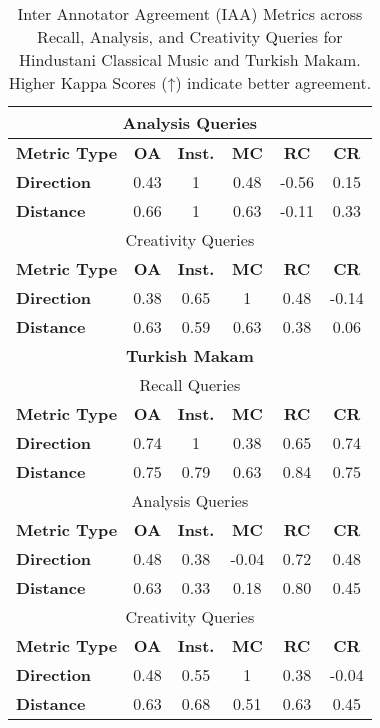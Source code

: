 \begin{table*}[!t]
\begin{minipage}{\textwidth}
{\begin{tabular}{lccccc}
\multicolumn{6}{c}{Analysis Queries} \\ \midrule
\textbf{Metric Type} & \textbf{OA} & \textbf{Inst.} & \textbf{MC} & \textbf{RC} & \textbf{CR} \\ \midrule
\textbf{Direction} & 0.43 & 1 & 0.48 & -0.56 & 0.15 \\
\textbf{Distance}  & 0.66 & 1 & 0.63 & -0.11 & 0.33 \\ \midrule

\multicolumn{6}{c}{Creativity Queries} \\ \midrule
\textbf{Metric Type} & \textbf{OA} & \textbf{Inst.} & \textbf{MC} & \textbf{RC} & \textbf{CR} \\ \midrule
\textbf{Direction} & 0.38 & 0.65 & 1 & 0.48 & -0.14 \\
\textbf{Distance}  & 0.63 & 0.59 & 0.63 & 0.38 & 0.06 \\ \midrule

\multicolumn{6}{c}{\textbf{Turkish Makam}} \\ \midrule

\multicolumn{6}{c}{Recall Queries} \\ \midrule
\textbf{Metric Type} & \textbf{OA} & \textbf{Inst.} & \textbf{MC} & \textbf{RC} & \textbf{CR} \\ \midrule
\textbf{Direction} & 0.74 & 1 & 0.38 & 0.65 & 0.74 \\
\textbf{Distance}  & 0.75 & 0.79 & 0.63 & 0.84 & 0.75 \\ \midrule

\multicolumn{6}{c}{Analysis Queries} \\ \midrule
\textbf{Metric Type} & \textbf{OA} & \textbf{Inst.} & \textbf{MC} & \textbf{RC} & \textbf{CR} \\ \midrule
\textbf{Direction} & 0.48 & 0.38 & -0.04 & 0.72 & 0.48 \\
\textbf{Distance}  & 0.63 & 0.33 & 0.18 & 0.80 & 0.45 \\ \midrule

\multicolumn{6}{c}{Creativity Queries} \\ \midrule
\textbf{Metric Type} & \textbf{OA} & \textbf{Inst.} & \textbf{MC} & \textbf{RC} & \textbf{CR} \\ \midrule
\textbf{Direction} & 0.48 & 0.55 & 1 & 0.38 & -0.04 \\
\textbf{Distance}  & 0.63 & 0.68 & 0.51 & 0.63 & 0.45 \\
\bottomrule
\end{tabular}}
\end{minipage}
\caption{Inter Annotator Agreement (IAA) Metrics across Recall, Analysis, and Creativity Queries for Hindustani Classical Music and Turkish Makam. Higher Kappa Scores (↑) indicate better agreement.}
\label{tab:inter_annotator_agreement_query}
\end{table*}